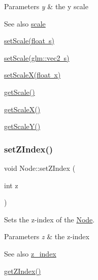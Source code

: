 \begin{DoxyParams}{Parameters}
{\em y} & the y scale \\
\hline
\end{DoxyParams}
\begin{DoxySeeAlso}{See also}
\mbox{\hyperlink{classsage_1_1Node_a3014b585d97d3a449e83bc0252db0c50}{scale}} 

\mbox{\hyperlink{classsage_1_1Node_a939698b2eb68ee5b60b91e2426e95369}{set\+Scale(float s)}} 

\mbox{\hyperlink{classsage_1_1Node_aecff30b003ce1c2266cc60a34b72559d}{set\+Scale(glm\+::vec2 s)}} 

\mbox{\hyperlink{classsage_1_1Node_ab8126397f90ccdee0755b984b26809d8}{set\+Scale\+X(float x)}} 

\mbox{\hyperlink{classsage_1_1Node_af1a9bc0715acbc80623b5a15a5f65f3f}{get\+Scale()}} 

\mbox{\hyperlink{classsage_1_1Node_a27040ef8ab59ccf42b87d6ddc8d794e6}{get\+Scale\+X()}} 

\mbox{\hyperlink{classsage_1_1Node_ab87661ab8940512baf2e7639ea55ff87}{get\+Scale\+Y()}} 
\end{DoxySeeAlso}
\mbox{\label{classsage_1_1Node_a16a5cb054eb05a3d22e97b6d690ebc3f}} 
\subsubsection{\texorpdfstring{setZIndex()}{setZIndex()}}
{\footnotesize\ttfamily void Node\+::set\+Z\+Index (\begin{DoxyParamCaption}\item[{int}]{z }\end{DoxyParamCaption})}



Sets the z-\/index of the \mbox{\hyperlink{classsage_1_1Node}{Node}}. 


\begin{DoxyParams}{Parameters}
{\em z} & the z-\/index \\
\hline
\end{DoxyParams}
\begin{DoxySeeAlso}{See also}
\mbox{\hyperlink{classsage_1_1Node_ad98383ce93e985bf20e1cd678c622097}{z\+\_\+index}} 

\mbox{\hyperlink{classsage_1_1Node_a8e9bb673c18c8637fb2bba6a0e2a8653}{get\+Z\+Index()}} 
\end{DoxySeeAlso}
\mbox{\label{classsage_1_1Node_aa7d796f1bad7d0e23a4cdd2575b4b9f3}} 
